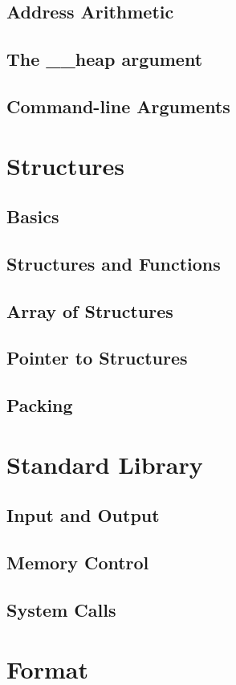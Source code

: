 \documentclass{scrartcl}
\begin{document}
        \subsection{Address Arithmetic}
        \subsection{The \_\_heap argument}
        \subsection{Command-line Arguments}
    \section{Structures}
        \subsection{Basics}
        \subsection{Structures and Functions}
        \subsection{Array of Structures}
        \subsection{Pointer to Structures}
        \subsection{Packing}
    \section{Standard Library}
        \subsection{Input and Output}
        \subsection{Memory Control}
        \subsection{System Calls}
    \section{Format}
\end{document}
